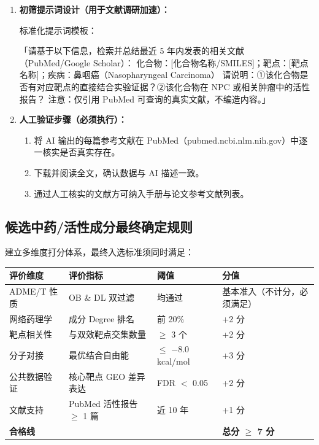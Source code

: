 \documentclass[12pt,a4paper,twoside]{article}
\begin{document}
\begin{enumerate}
  \item \textbf{初筛提示词设计（用于文献调研加速）：}

    标准化提示词模板：
    \begin{greenbox}
    「请基于以下信息，检索并总结最近 5 年内发表的相关文献（PubMed/Google Scholar）：
    化合物：[化合物名称/SMILES]；靶点：[靶点名称]；疾病：鼻咽癌（Nasopharyngeal Carcinoma）
    请说明：①该化合物是否有对应靶点的直接结合实验证据？②该化合物在 NPC 或相关肿瘤中的活性报告？
    注意：仅引用 PubMed 可查询的真实文献，不编造内容。」
    \end{greenbox}

  \item \textbf{人工验证步骤（必须执行）：}
    \begin{enumerate}
      \item 将 AI 输出的每篇参考文献在 PubMed（pubmed.ncbi.nlm.nih.gov）中逐一核实是否真实存在。
      \item 下载并阅读全文，确认数据与 AI 描述一致。
      \item 通过人工核实的文献方可纳入手册与论文参考文献列表。
    \end{enumerate}
\end{enumerate}

\subsection{候选中药/活性成分最终确定规则}
\label{sec:module4_selection}

建立多维度打分体系，最终入选标准须同时满足：

\begin{center}
\begin{tabular}{p{4cm}p{4cm}p{2cm}p{3.5cm}}
\toprule
\textbf{评价维度} & \textbf{评价指标} & \textbf{阈值} & \textbf{分值} \\
\midrule
ADME/T 性质 & OB \& DL 双过滤 & 均通过 & 基本准入（不计分，必须满足）\\
\addlinespace
网络药理学 & 成分 Degree 排名 & 前 20\% & +2 分 \\
\addlinespace
靶点相关性 & 与双效靶点交集数量 & $\geq$ 3 个 & +2 分 \\
\addlinespace
分子对接 & 最优结合自由能 & $\leq$ $-$8.0 kcal/mol & +3 分 \\
\addlinespace
公共数据验证 & 核心靶点 GEO 差异表达 & FDR $<$ 0.05 & +2 分 \\
\addlinespace
文献支持 & PubMed 活性报告 $\geq$ 1 篇 & 近 10 年 & +1 分 \\
\bottomrule
\textbf{合格线} & & & \textbf{总分 $\geq$ 7 分} \\
\bottomrule
\end{tabular}
\end{center}
\end{document}
